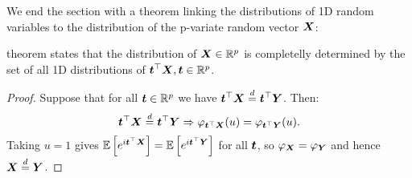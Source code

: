 We end the section with a theorem linking the distributions of 1D random variables to the distribution of the p-variate random vector $\X$:
\begin{theorem}
     theorem states that the distribution of $\X\in\R^p$ is completelly determined by the set of all 1D distributions of $\mt^\top\X, \mt\in\R^p$.
\end{theorem}
\begin{proof}
    Suppose that for all $\mt\in\R^p$ we have $\mt^\top \X \overset{d}{=} \mt^\top \Y$. Then:
    $$
        \mt^\top \X \overset{d}{=} \mt^\top \Y \Rightarrow \phi_{\mt^\top\X}(u) = \phi_{\mt^\top\Y}(u).
    $$
    Taking $u=1$ gives $\ev{e^{i\mt^\top\X}} = \ev{e^{i\mt^\top\Y}}$ for all $\mt$, so $\phi_{\X}=\phi_{\Y}$ and hence $\X \overset{d}{=}  \Y$.
\end{proof}